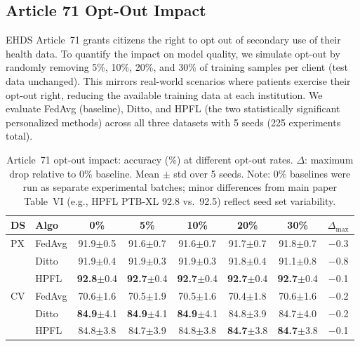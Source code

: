 \documentclass[conference,a4paper]{IEEEtran}
\begin{document}
\subsection{Article 71 Opt-Out Impact}
\label{sec:optout}

EHDS Article~71 grants citizens the right to opt out of secondary use of their health data. To quantify the impact on model quality, we simulate opt-out by randomly removing 5\%, 10\%, 20\%, and 30\% of training samples per client (test data unchanged). This mirrors real-world scenarios where patients exercise their opt-out right, reducing the available training data at each institution. We evaluate FedAvg (baseline), Ditto, and HPFL (the two statistically significant personalized methods) across all three datasets with 5 seeds (225 experiments total).

\begin{table}[t]
\centering
\caption{Article~71 opt-out impact: accuracy (\%) at different opt-out rates. $\Delta$: maximum drop relative to 0\% baseline. Mean $\pm$ std over 5 seeds. Note: 0\% baselines were run as separate experimental batches; minor differences from main paper Table~VI (e.g., HPFL PTB-XL 92.8 vs.\ 92.5) reflect seed set variability.}
\label{tab:optout}
\footnotesize
\begin{tabular}{ll ccccc c}
\toprule
\textbf{DS} & \textbf{Algo} & \textbf{0\%} & \textbf{5\%} & \textbf{10\%} & \textbf{20\%} & \textbf{30\%} & $\Delta_{\max}$ \\
\midrule
PX & FedAvg & 91.9{\tiny$\pm$0.5} & 91.6{\tiny$\pm$0.7} & 91.6{\tiny$\pm$0.7} & 91.7{\tiny$\pm$0.7} & 91.8{\tiny$\pm$0.7} & $-$0.3 \\
 & Ditto & 91.9{\tiny$\pm$0.4} & 91.9{\tiny$\pm$0.3} & 91.9{\tiny$\pm$0.3} & 91.8{\tiny$\pm$0.4} & 91.1{\tiny$\pm$0.8} & $-$0.8 \\
 & HPFL & \textbf{92.8}{\tiny$\pm$0.4} & \textbf{92.7}{\tiny$\pm$0.4} & \textbf{92.7}{\tiny$\pm$0.4} & \textbf{92.7}{\tiny$\pm$0.4} & \textbf{92.7}{\tiny$\pm$0.4} & $-$0.1 \\
\midrule
CV & FedAvg & 70.6{\tiny$\pm$1.6} & 70.5{\tiny$\pm$1.9} & 70.5{\tiny$\pm$1.6} & 70.4{\tiny$\pm$1.8} & 70.6{\tiny$\pm$1.6} & $-$0.2 \\
 & Ditto & \textbf{84.9}{\tiny$\pm$4.1} & \textbf{84.9}{\tiny$\pm$4.1} & \textbf{84.9}{\tiny$\pm$4.1} & 84.8{\tiny$\pm$3.9} & 84.7{\tiny$\pm$4.0} & $-$0.2 \\
 & HPFL & 84.8{\tiny$\pm$3.8} & 84.7{\tiny$\pm$3.9} & 84.8{\tiny$\pm$3.8} & \textbf{84.7}{\tiny$\pm$3.8} & \textbf{84.7}{\tiny$\pm$3.8} & $-$0.1 \\

\end{tabular}
\end{table}
\end{document}
